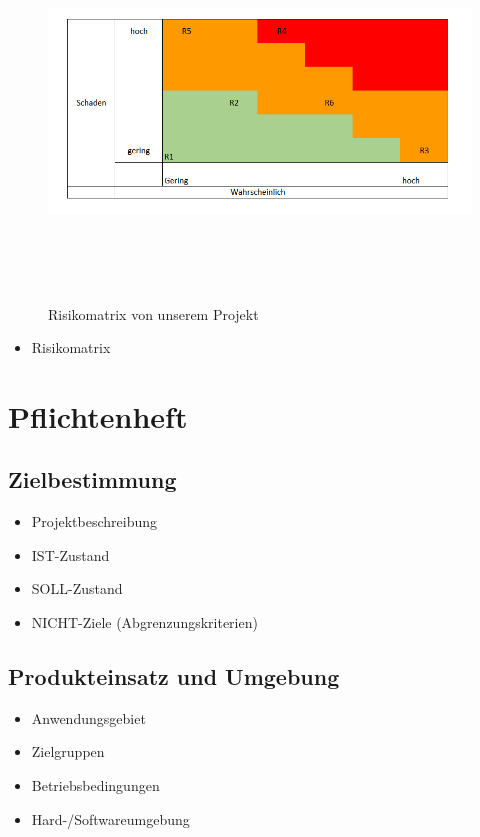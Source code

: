 \begin{figure}
	\includegraphics[height=10cm]{figures/risiko}
	\caption{Risikomatrix von unserem Projekt}
\end{figure}

\begin{itemize}
	\item Risikomatrix
\end{itemize}
\section{Pflichtenheft}
\subsection{Zielbestimmung}
\begin{itemize}
	\item Projektbeschreibung
	\item IST-Zustand
	\item SOLL-Zustand
	\item NICHT-Ziele (Abgrenzungskriterien)
\end{itemize}
\subsection{Produkteinsatz und Umgebung}
\begin{itemize}
	\item Anwendungsgebiet
	\item Zielgruppen
	\item Betriebsbedingungen
	\item Hard-/Softwareumgebung
\end{itemize}
